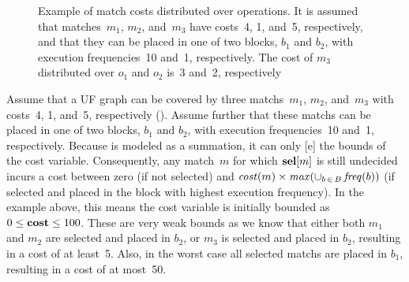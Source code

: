 \begin{figure}
  \caption[Example of match costs distributed over operations]%
          {%
            Example of match costs distributed over operations.
            It is assumed that matches~$m_1$, $m_2$, and~$m_3$ have
            costs~\num{4}, \num{1}, and~\num{5}, respectively, and that they can
            be placed in one of two blocks, $b_1$ and $b_2$, with execution
            frequencies~\num{10} and~\num{1}, respectively.
            The cost of $m_3$ distributed over $o_1$ and $o_2$ is~\num{3}
            and~\num{2}, respectively%
          }
\end{figure}
%
Assume that a \gls{UF graph} can be covered by three \glspl{match}~$m_1$, $m_2$,
and~$m_3$ with costs~\num{4}, \num{1}, and~\num{5}, respectively
().
%
Assume further that these \glspl{match} can be placed in one of two blocks,
$b_1$ and $b_2$, with execution frequencies~\num{10} and~\num{1}, respectively.
%
Because  is modeled as a summation, it can
only [e] the bounds of the \gls{cost variable}.
%
Consequently, any \gls{match}~$m$ for which $\mVar{sel}[m]$ is still undecided
incurs a cost between zero (if not selected) and \mbox{$\operatorname{\textrm{\textit{cost}}}(m) \times
  \operatorname{\textrm{\textit{max}}}(\cup_{b \,\in\, B} \operatorname{\textrm{\textit{freq}}}(b))$} (if selected and placed in the
\gls{block} with highest execution frequency).
%
In the example above, this means the \gls{cost variable} is initially bounded as
\mbox{$0 \leq \mVar{cost} \leq 100$}.
%
These are very weak bounds as we know that either both $m_1$ and $m_2$ are
selected and placed in $b_2$, or $m_3$ is selected and placed in $b_2$,
resulting in a cost of at least~\num{5}.
%
Also, in the worst case all selected \glspl{match} are placed in $b_1$,
resulting in a cost of at most~\num{50}.


